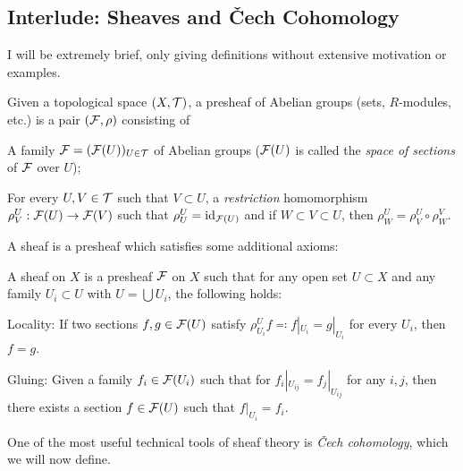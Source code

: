 \documentclass[parskip=half]{scrartcl}
\begin{document}
\subsection{Interlude: Sheaves and \v{C}ech Cohomology}

I will be extremely brief, only giving definitions without extensive motivation or examples.

\begin{onboard}
\begin{mydef}
	Given a topological space $(X,\mathcal{T})$, a presheaf of Abelian groups (sets, $R$-modules, etc.) is a pair $(\mathcal{F},\rho)$ consisting of
	\begin{numberedlist}
		\item A family $\mathcal{F}=(\mathcal{F}(U))_{U\in \mathcal{T}}$ of Abelian groups ($\mathcal{F}(U)$ is called the \emph{space of sections} of $\mathcal{F}$ over $U$);
		\item For every $U,V\in \mathcal{T}$ such that $V\subset U$, a \emph{restriction} homomorphism $\rho^U_V:\mathcal{F}(U)\to \mathcal{F}(V)$ such that $\rho^U_U=\operatorname{id}_{\mathcal{F}(U)}$ and if $W\subset V\subset U$, then $\rho^U_W=\rho^U_V\circ\rho^V_W$.
	\end{numberedlist}
\end{mydef}
\end{onboard}

A sheaf is a presheaf which satisfies some additional axioms:

\begin{onboard}
\begin{mydef}
	A sheaf on $X$ is a presheaf $\mathcal{F}$ on $X$ such that for any open set $U\subset X$ and any family $U_i\subset U$ with $U=\bigcup U_i$, the following holds:
	\begin{numberedlist}
		\item {\sffamily Locality:} If two sections $f,g\in \mathcal{F}(U)$ satisfy $\rho^U_{U_i}f\eqqcolon f|_{U_i}=g|_{U_i}$ for every $U_i$, then $f=g$.
		\item {\sffamily Gluing:} Given a family $f_i\in \mathcal{F}(U_i)$ such that for $f_i|_{U_{ij}}=f_j|_{U_{ij}}$ for any $i,j$, then there exists a section $f\in \mathcal{F}(U)$ such that $f|_{U_i}=f_i$.
	\end{numberedlist}
\end{mydef}
\end{onboard}

One of the most useful technical tools of sheaf theory is \emph{\v{C}ech cohomology}, which we will now define. 
\end{document}
